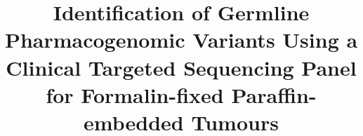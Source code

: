 \documentclass{bmcart}
\begin{document}
\begin{frontmatter}

\begin{fmbox}


\title{Identification of Germline Pharmacogenomic Variants Using a Clinical Targeted Sequencing Panel for Formalin-fixed Paraffin-embedded Tumours}


\author[
   addressref={aff1},                   %
   email={eyap@bcgsc.ca}   %
]{ }
\author[
   addressref={aff1,aff2},
	 corref={aff1},                       %
   email={akarsan@bcgsc.ca}
]{ }


\address[id=aff1]{%
  , %
  ,                     %
  ,                              %
}
\address[id=aff2]{%
  ,
  ,
  ,
}


\end{fmbox}
\end{frontmatter}
\end{document}
